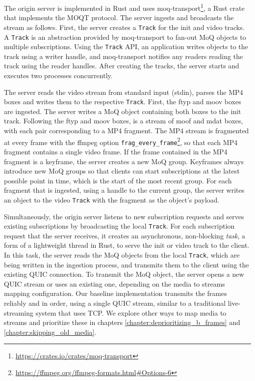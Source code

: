 The origin server is implemented in Rust and uses moq-transport\footnote{\url{https://crates.io/crates/moq-transport}}, a Rust crate that implements the \ac{MOQT} protocol. The server ingests and broadcasts the stream as follows. First, the server creates a \lstinline{Track} for the init and video tracks. A \lstinline{Track} is an abstraction provided by moq-transport to fan-out MoQ objects to multiple subscriptions. Using the \lstinline{Track} API, an application writes objects to the track using a writer handle, and moq-transport notifies any readers reading the track using the reader handles. After creating the tracks, the server starts and executes two processes concurrently.

The server reads the video stream from standard input (stdin), parses the MP4 boxes and writes them to the respective \lstinline{Track}. First, the ftyp and moov boxes are ingested. The server writes a MoQ object containing both boxes to the init track. Following the ftyp and moov boxes, is a stream of moof and mdat boxes, with each pair corresponding to a MP4 fragment. The MP4 stream is fragmented at every frame with the ffmpeg option \lstinline{frag_every_frame}\footnote{\url{https://ffmpeg.org/ffmpeg-formats.html\#Options-6}}, so that each MP4 fragment contains a single video frame. If the frame contained in the MP4 fragment is a keyframe, the server creates a new MoQ group. Keyframes always introduce new MoQ groups so that clients can start subscriptions at the latest possible point in time, which is the start of the most recent group. For each fragment that is ingested, using a handle to the current group, the server writes an object to the video \lstinline{Track} with the fragment as the object's payload.

Simultaneously, the origin server listens to new subscription requests and serves existing subscriptions by broadcasting the local \lstinline{Track}. For each subscription request that the server receives, it creates an asynchronous, non-blocking \textit{task}, a form of a lightweight thread in Rust,  to serve the init or video track to the client. In this task, the server reads the MoQ objects from the local \lstinline{Track}, which are being written in the ingestion process, and transmits them to the client using the existing QUIC connection. To transmit the MoQ object, the server opens a new QUIC stream or uses an existing one, depending on the media to streams mapping configuration. Our baseline implementation transmits the frames reliably and in order, using a single QUIC stream, similar to a traditional live-streaming system that uses TCP. We explore other ways to map media to streams and prioritize these in chapters \autoref{chapter:deprioritizing_b_frames} and \autoref{chapter:skipping_old_media}.

